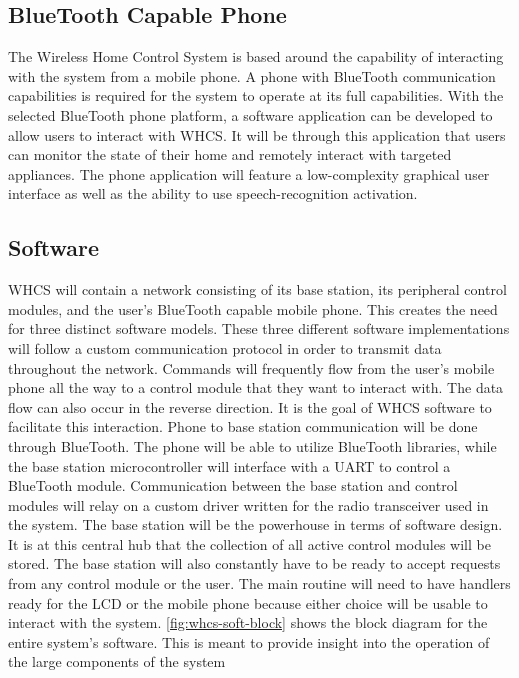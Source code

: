 
\subsection{BlueTooth Capable Phone}
{\color{black} The Wireless Home Control System is based around the capability
of interacting with the system from a mobile phone. A phone with BlueTooth
communication capabilities is required for the system to operate at its full
capabilities. With the selected BlueTooth phone platform, a software
application can be developed to allow users to interact with WHCS. It will be
through this application that users can monitor the state of their home and
remotely interact with targeted appliances. The phone application will feature
a low{}-complexity graphical user interface as well as the ability to use
speech{}-recognition activation. }

\subsection{Software}
WHCS will contain a network consisting of its base station, its peripheral
control modules, and the user{}'s BlueTooth capable mobile phone. This creates
the need for three distinct software models. These three different software
implementations will follow a custom communication protocol in order to
transmit data throughout the network. Commands will frequently flow from the
user{}'s mobile phone all the way to a control module that they want to
interact with.  The data flow can also occur in the reverse direction. It is
the goal of WHCS software to facilitate this interaction.  Phone to base
station communication will be done through BlueTooth. The phone will be able to
utilize BlueTooth libraries, while the base station microcontroller will
interface with a UART to control a BlueTooth module.  Communication between the
base station and control modules will relay on a custom driver written for the
radio transceiver used in the system. The base station will be the powerhouse
in terms of software design. It is at this central hub that the collection of
all active control modules will be stored. The base station will also
constantly have to be ready to accept requests from any control module or the
user. The main routine will need to have handlers ready for the LCD or the
mobile phone because either choice will be usable to interact with the system.
\autoref{fig:whcs-soft-block} shows the block diagram for the entire system{}'s
software. This is meant to provide insight into the operation of the large
components of the system

